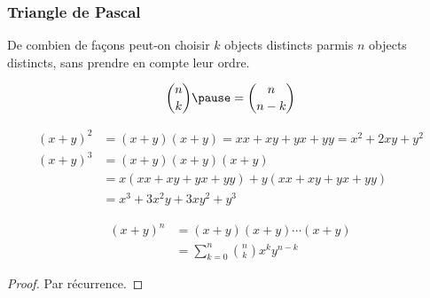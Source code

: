 \begin{frame}%
  \frametitle{Triangle de Pascal}
  \pause
\end{frame}
\begin{frame}%
  \begin{question}
  De combien de façons peut-on choisir \(k\) objects distincts parmis \(n\) objects distincts, sans prendre en compte leur ordre.
\end{question}
\begin{answer}\pause
  \begin{equation*}
  \binom{n}{k} \pause = \binom{n}{n-k}
\end{equation*}
\end{answer}\pause
  \begin{example}
    \begin{align*}
      (x+y)^2 &= (x+y)(x+y) = xx + xy + yx + yy = x^{2} + 2 xy + y^{2}\\
      (x+y)^3 &= (x+y)(x+y)(x+y)\\
              &= x(xx + xy + yx + yy) + y(xx + xy + yx + yy)\\
              &= x^{3} + 3 x^{2}y + 3 xy^{2} + y^{3}
    \end{align*}
  \end{example}
\end{frame}
\begin{frame}%
  \begin{proposition}
    \begin{align*}
      (x+y)^{n} &= (x+y)(x+y)\cdots(x+y)\\
                &=   \sum_{k=0}^{n} \binom{n}{k} x^{k} y^{n-k}
    \end{align*}
  \end{proposition}
  \begin{proof}
    Par récurrence.
  \end{proof}
\end{frame}

